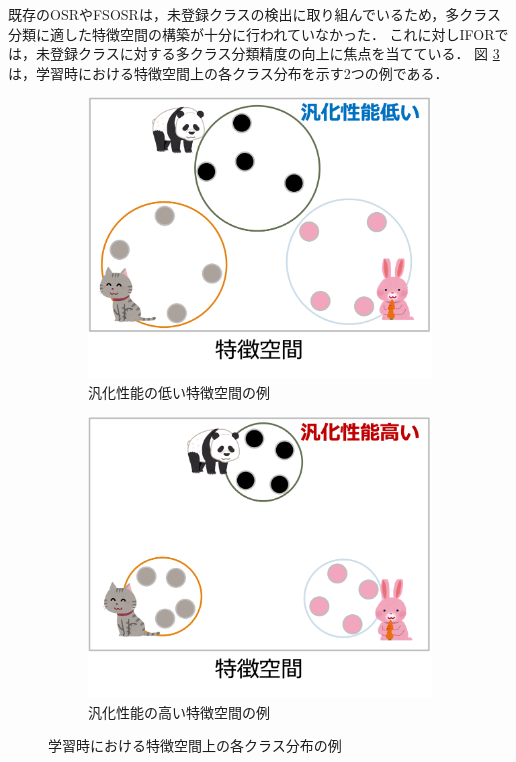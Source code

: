 \documentclass[a4paper,11pt,nomag]{jsreport}
\begin{document}
既存のOSRやFSOSRは，未登録クラスの検出に取り組んでいるため，多クラス分類に適した特徴空間の構築が十分に行われていなかった．
これに対しIFORでは，未登録クラスに対する多クラス分類精度の向上に焦点を当てている．
図 \ref{fig:feature_space}は，学習時における特徴空間上の各クラス分布を示す2つの例である．
% 
\begin{figure}[tbp]
  \centering
  \begin{subfigure}[b]{0.45\linewidth}
    \centering
    \includegraphics[height=0.9\linewidth, keepaspectratio]{image/bad_featurespace.png}
    \caption{汎化性能の低い特徴空間の例}
    \label{fig:bad_featurespace}
  \end{subfigure}
  \hfill
  \begin{subfigure}[b]{0.45\linewidth}
    \centering
    \includegraphics[height=0.9\linewidth, keepaspectratio]{image/good_featurespace.png}
    \caption{汎化性能の高い特徴空間の例}
    \label{fig:good_featurespace}
  \end{subfigure}
  \caption{学習時における特徴空間上の各クラス分布の例}
  \label{fig:feature_space}
\end{figure}
\end{document}
